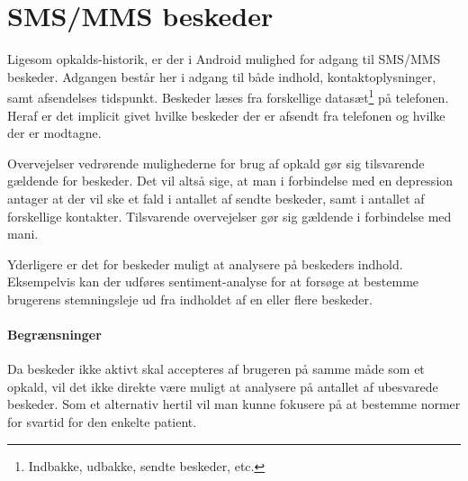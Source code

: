 \section{SMS/MMS beskeder}\label{datasamling:smsmms}
Ligesom opkalds-historik, er der i Android mulighed for adgang til SMS/MMS beskeder.
Adgangen består her i adgang til både indhold, kontaktoplysninger, samt afsendelses tidspunkt.
Beskeder læses fra forskellige datasæt\footnote{Indbakke, udbakke, sendte beskeder, etc.} på telefonen.
Heraf er det implicit givet hvilke beskeder der er afsendt fra telefonen og hvilke der er modtagne.

Overvejelser vedrørende mulighederne for brug af opkald gør sig tilsvarende gældende for beskeder.
Det vil altså sige, at man i forbindelse med en depression antager at der vil ske et fald i antallet af sendte beskeder, samt i antallet af forskellige kontakter.
Tilsvarende overvejelser gør sig gældende i forbindelse med mani.

Yderligere er det for beskeder muligt at analysere på beskeders indhold.
Eksempelvis kan der udføres sentiment-analyse for at forsøge at bestemme brugerens stemningsleje ud fra indholdet af en eller flere beskeder.

\paragraph{Begrænsninger}
Da beskeder ikke aktivt skal accepteres af brugeren på samme måde som et opkald, vil det ikke direkte være muligt at analysere på antallet af ubesvarede beskeder.
Som et alternativ hertil vil man kunne fokusere på at bestemme normer for svartid for den enkelte patient.
